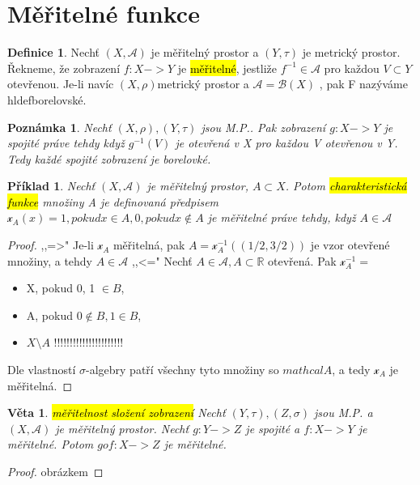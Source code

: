 \documentclass{article}
\DeclareRobustCommand{\hldef}[1]{{\sethlcolor{SkyBlue}\hl{#1}}}
\DeclareRobustCommand{\hlveta}[1]{{\sethlcolor{magenta}\hl{#1}}}
\newtheorem{veta}{Věta}[section]
\newtheorem*{pozn}{Poznámka}
\newtheorem*{pr}{Příklad}
\theoremstyle{definition}
\newtheorem*{definice}{Definice}
\begin{document}
\section{Měřitelné funkce}
\begin{definice}
    Nechť \((X, \mathcal{A})\) je měřitelný prostor a \((Y, \tau)\) je metrický prostor. 
    Řekneme, že zobrazení \(f: X -> Y\) je \hldef{měřitelné}, jestliže \(f^{-1} \in \mathcal{A}\) 
    pro každou \(V \subset Y\) otevřenou. Je-li navíc \((X, \rho)\)metrický prostor a \(\mathcal{A} = \mathcal{B}(X)\) 
    , pak F nazýváme hldef{borelovské}.
\end{definice}
\begin{pozn}
    Nechť \((X, \rho), (Y, \tau)\) jsou M.P.. Pak zobrazení \(g: X -> Y\) je spojité práve tehdy když 
    \(g^{-1}(V)\) je otevřená v X pro každou V otevřenou v Y.
    Tedy každé spojité zobrazení je borelovké.
\end{pozn}
\begin{pr}
Nechť \((X, \mathcal{A})\) je měřitelný prostor, \(A \subset X\). Potom \hldef{charakteristická funkce} 
množiny A je definovaná předpisem \(\mathcal{x}_A (x) = 1, pokud x \in A, 0, pokud x \notin A\) je 
měřitelné práve tehdy, když \(A \in \mathcal{A}\)
\end{pr}
\begin{proof}
    ,,=>" Je-li \(\mathcal{x}_A\) měřitelná, pak \(A = \mathcal{x}_A^{-1} ((1/2, 3/2))\) je vzor otevřené množiny, a 
    tehdy \(A \in \mathcal{A}\)
    ,,<=" Nechť \(A \in \mathcal{A}, A \subset \mathbb{R}\) otevřená. Pak 
    \(\mathcal{x}_A^{-1} = \)
    \begin{itemize}
        \item X, pokud 0, 1 \(\in B\),
        \item A, pokud \(0 \notin B, 1 \in B\),
        \item \(X \setminus A\)
        !!!!!!!!!!!!!!!!!!!!!!
    \end{itemize}
    Dle vlastností \(\sigma\)-algebry patří všechny tyto množiny so \(mathcal{A}\), a tedy \(\mathcal{x}_A\) je měřitelná.
\end{proof}
\begin{veta}
    \hlveta{měřitelnost složení zobrazení}
    Nechť \((Y, \tau), (Z, \sigma) \) jsou M.P. a \((X, \mathcal{A})\) je měřitelný prostor. 
    Nechť \(g: Y -> Z\) je spojité a \( f:X->Y \) je měřitelné. Potom \(gof: X -> Z\) je měřitelné.
\end{veta}
\begin{proof}
    obrázkem
\end{proof}
\end{document}
